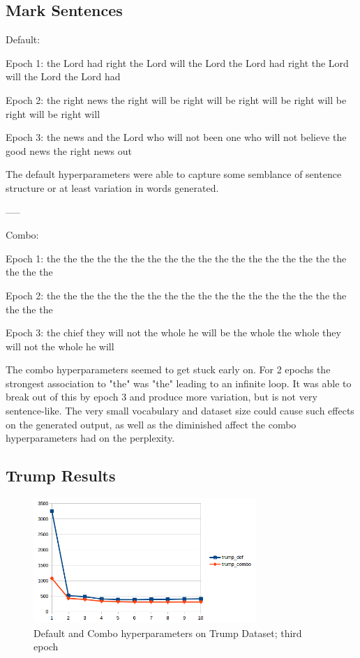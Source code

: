 \documentclass[10pt,a4paper]{article}
\begin{document}
\subsection{Mark Sentences}
Default:


Epoch 1: the Lord had right the Lord will the Lord the Lord had right the Lord will the Lord the Lord had

Epoch 2: the right news the right will be right will be right will be right will be right will be right will

Epoch 3: the news and the Lord who will not been one who will not believe the good news the right news out

The default hyperparameters were able to capture some semblance of sentence structure or at least variation in words generated.

-----

Combo:


Epoch 1: the the the the the the the the the the the the the the the the the the the the the

Epoch 2: the the the the the the the the the the the the the the the the the the the the the

Epoch 3: the chief they will not the whole he will be the whole the whole they will not the whole he will

The combo hyperparameters seemed to get stuck early on. For 2 epochs the strongest association to "the" was "the" leading to an infinite loop. It was able to break out of this by epoch 3 and produce more variation, but is not very sentence-like. The very small vocabulary and dataset size could cause such effects on the generated output, as well as the diminished affect the combo hyperparameters had on the perplexity.

\subsection{Trump Results}

\begin{figure}[H]
  \begin{center}
    \includegraphics[width=0.75\textwidth] {trump1.png}
    \caption{Default and Combo hyperparameters on Trump Dataset; third epoch}
  \end{center}
\end{figure}
\end{document}
